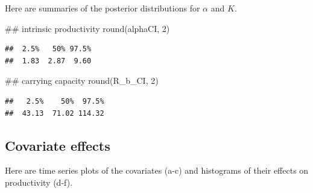 \documentclass[11pt,]{article}
\newenvironment{Shaded}{}{}
\newcommand{\KeywordTok}[1]{\textcolor[rgb]{0.00,0.00,1.00}{#1}}
\newcommand{\DecValTok}[1]{#1}
\newcommand{\NormalTok}[1]{#1}
\begin{document}
Here are summaries of the posterior distributions for \(\alpha\) and
\(K\).

\begin{Shaded}
\begin{Highlighting}[]
\NormalTok{## intrinsic productivity}
\KeywordTok{round}\NormalTok{(alphaCI, }\DecValTok{2}\NormalTok{)}
\end{Highlighting}
\end{Shaded}

\begin{verbatim}
##  2.5%   50% 97.5% 
##  1.83  2.87  9.60
\end{verbatim}

\begin{Shaded}
\begin{Highlighting}[]
\NormalTok{## carrying capacity}
\KeywordTok{round}\NormalTok{(R_b_CI, }\DecValTok{2}\NormalTok{)}
\end{Highlighting}
\end{Shaded}

\begin{verbatim}
##   2.5%    50%  97.5% 
##  43.13  71.02 114.32
\end{verbatim}

\subsection{Covariate effects}\label{covariate-effects}

Here are time series plots of the covariates (a-c) and histograms of
their effects on productivity (d-f).
\end{document}
